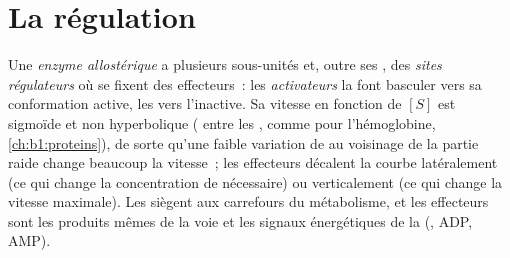 \section{La régulation}

\begin{definition}\label{def:b1:enzymes:allosteric}
Une \emph{enzyme allostérique} a plusieurs
sous-unités et, outre ses , des \emph{sites régulateurs} où
se fixent des effecteurs~: les \emph{activateurs} la font basculer vers
sa conformation active, les \emph{} vers l'inactive. Sa
vitesse en fonction de $[S]$ est sigmoïde et non hyperbolique
( entre les , comme pour l'hémoglobine,
\cref{ch:b1:proteins}), de sorte qu'une faible variation de  au
voisinage de la partie raide change beaucoup la vitesse~; les effecteurs
décalent la courbe latéralement (ce qui change la concentration de
 nécessaire) ou verticalement (ce qui change la vitesse
maximale). Les   siègent aux carrefours du
métabolisme, et les effecteurs sont les produits mêmes de la voie et les
signaux énergétiques de la  (, ADP, AMP).
\end{definition}

